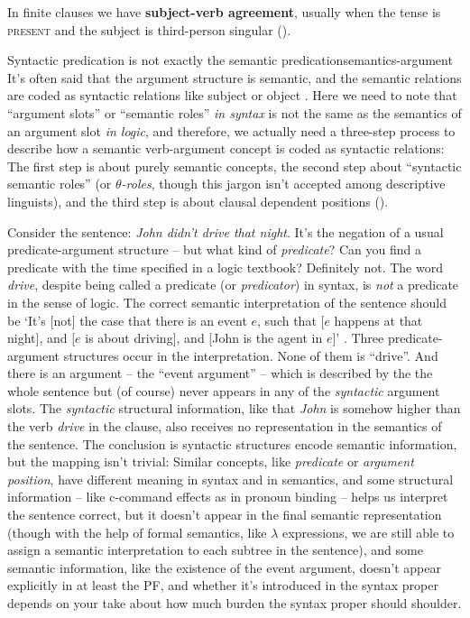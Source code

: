\documentclass[UTF8, a4paper, oneside, scheme=plain]{ctexrep}
\newcommand*{\citepage}[1]{pp.~{#1}}
\newcommand*{\concept}[1]{\textbf{#1}}
\newcommand*{\term}[1]{\emph{#1}}
\newcommand{\corpus}[1]{\emph{#1}}
\newcommand{\category}[1]{\textsc{#1}}
\newcommand{\translate}[1]{`#1'}
\begin{document}
In finite clauses we have \concept{subject-verb agreement},
usually when the tense is \category{present}
and the subject is third-person singular 
().

\begin{theorybox}{Syntactic predication is not exactly the semantic predication}{semantics-argument}
    It's often said that the argument structure is semantic, 
    and the semantic relations are coded as syntactic relations like subject or object
    \citep[\citepage{111}]{dixon2005semantic}.
    Here we need to note that ``argument slots'' or ``semantic roles'' \emph{in syntax}
    is not the same as the semantics of an argument slot \emph{in logic},
    and therefore,
    we actually need a three-step process to describe how a semantic verb-argument concept 
    is coded as syntactic relations:
    The first step is about purely semantic concepts,
    the second step about ``syntactic semantic roles''
    (or \term{$\theta$-roles}, though this jargon isn't accepted among descriptive linguists),
    and the third step is about clausal dependent positions 
    ().

    Consider the sentence: \corpus{John didn't drive that night}. 
    It's the negation of a usual predicate-argument structure
    -- but what kind of \term{predicate}?
    Can you find a predicate with the time specified in a logic textbook?
    Definitely not. 
    The word \corpus{drive}, despite being called a predicate (or \term{predicator}) in syntax,
    is \emph{not} a predicate in the sense of logic.
    The correct semantic interpretation of the sentence should be 
    \translate{It's [not] the case that there is an event $e$, such that
    [$e$ happens at that night], and [$e$ is about driving], 
    and [John is the agent in $e$]} \citep{zeijlstra2013}.
    Three predicate-argument structures occur in the interpretation.
    None of them is ``drive''.
    And there is an argument -- the ``event argument'' --
    which is described by the the whole sentence but (of course) 
    never appears in any of the \emph{syntactic} argument slots.
    The \emph{syntactic} structural information,
    like that \corpus{John} is somehow higher than the verb \corpus{drive} in the clause,
    also receives no representation in the semantics of the sentence.
    The conclusion is syntactic structures encode semantic information,
    but the mapping isn't trivial:
    Similar concepts, like \term{predicate} or \term{argument position},
    have different meaning in syntax and in semantics, and 
    some structural information -- like c-command effects as in pronoun binding --
    helps us interpret the sentence correct,
    but it doesn't appear in the final semantic representation 
    (though with the help of formal semantics, like $\lambda$ expressions,
    we are still able to assign a semantic interpretation to each subtree in the sentence),
    and some semantic information, like the existence of the event argument,
    doesn't appear explicitly in at least the PF, 
    and whether it's introduced in the syntax proper depends on 
    your take about how much burden the syntax proper should shoulder.
\end{theorybox}
\end{document}
